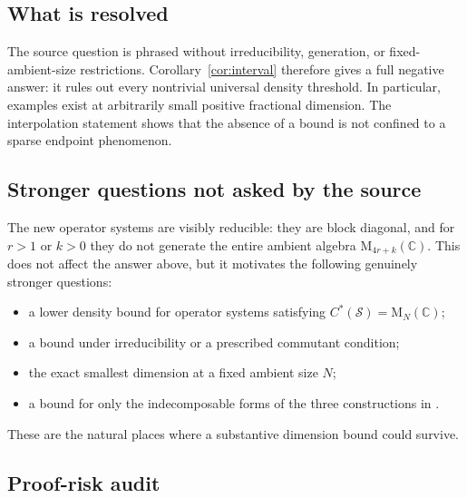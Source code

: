\documentclass[11pt]{article}
\theoremstyle{remark}
\newcommand{\C}{\mathbb C}
\newcommand{\M}{\mathrm M}
\begin{document}
\subsection*{What is resolved}

The source question is phrased without irreducibility, generation, or fixed-ambient-size restrictions.  Corollary~\ref{cor:interval} therefore gives a full negative answer: it rules out every nontrivial universal density threshold.  In particular, examples exist at arbitrarily small positive fractional dimension.  The interpolation statement shows that the absence of a bound is not confined to a sparse endpoint phenomenon.

\subsection*{Stronger questions not asked by the source}

The new operator systems are visibly reducible: they are block diagonal, and for $r>1$ or $k>0$ they do not generate the entire ambient algebra $\M_{4r+k}(\C)$.  This does not affect the answer above, but it motivates the following genuinely stronger questions:

\begin{itemize}
  \item a lower density bound for operator systems satisfying $C^*(\mathcal S)=\M_N(\C)$;
  \item a bound under irreducibility or a prescribed commutant condition;
  \item the exact smallest dimension at a fixed ambient size $N$;
  \item a bound for only the indecomposable forms of the three constructions in \cite{CDPR}.
\end{itemize}

These are the natural places where a substantive dimension bound could survive.

\subsection*{Proof-risk audit}
\end{document}
